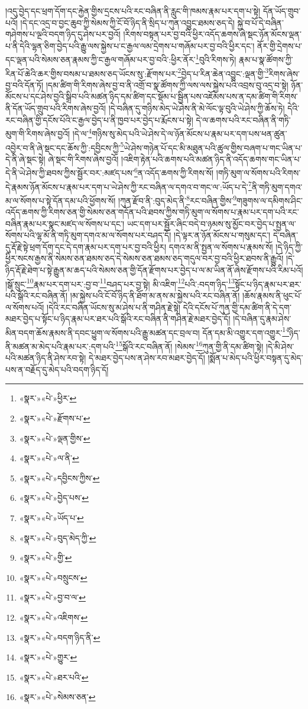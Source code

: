 །འདུ་བྱེད་དང་ཕྲག་དོག་དང་རྐྱེན་གྱིས་དྲངས་པའི་རང་བཞིན་ནི་རླུང་གི་ཁམས་རྣམ་པར་དག་པ་སྟེ། དོན་ཡོད་གྲུབ་པའོ། །དེ་དང་འདྲ་བ་བྱང་ཆུབ་ཀྱི་སེམས་ཀྱི་ངོ་བོ་ཉིད་ནི་སྲིད་པ་ཀུན་འབྱུང་ཐམས་ཅད་དེ། སྐྱེ་བ་པོ་དེ་བཞིན་གཤེགས་པ་ལྔའི་བདག་ཉིད་དུ་ཤེས་པར་བྱའོ། །རིགས་བསྟན་པར་བྱ་བའི་ཕྱིར་འདོད་ཆགས་ཞེ་སྡང་ཉོན་མོངས་ལྡན་པ་ནི་དེའི་ལྷན་ཅིག་བྱེད་པའི་རྒྱུ་ལས་སྐྱེས་པ་ང་རྒྱལ་ལམ་དྲེགས་པ་གཞོམ་པར་བྱ་བའི་ཕྱིར་དང་། ནོར་གྱི་དྲེགས་པ་དང་ལྡན་པའི་སེམས་ཅན་རྣམས་ཀྱི་ང་རྒྱལ་གཞོམ་པར་བྱ་བའི་:ཕྱིར་ནོར་\footnote{«སྣར་»«པེ་»ཕྱིར་}བུའི་རིགས་ཏེ། རྣམ་པ་སྣ་ཚོགས་ཀྱི་རིན་པོ་ཆེའི་ཆར་གྱིས་བསམ་པ་ཐམས་ཅད་ཡོངས་སུ་:རྫོགས་པར་\footnote{«སྣར་»«པེ་»རྫོགས་པ་}བྱེད་པ་རིན་ཆེན་འབྱུང་:ལྡན་གྱི་\footnote{«སྣར་»«པེ་»ལྡན་གྱིས་}རིགས་ཞེས་བྱ་བའི་དོན་ཏོ། །དམ་ཚིག་གི་རིགས་ཞེས་བྱ་བ་ནི་འགྲོ་བ་སྣ་ཚོགས་ཀྱི་ལས་ལས་སྐྱེས་པའི་འབྲས་བུ་འདྲ་བ་སྟེ། ཉོན་མོངས་པ་དང་ཤེས་བྱའི་སྒྲིབ་པའི་མཚན་ཉིད་དམ་ཚིག་དང་སྡོམ་པ་སྦྱིན་པས་འཇོམས་པས་ན་དམ་ཚིག་གི་རིགས་ནི་དོན་ཡོད་གྲུབ་པའི་རིགས་ཞེས་བྱའོ། །དེ་བཞིན་དུ་གཉིས་མེད་ཡེ་ཤེས་ནི་མེ་ལོང་ལྟ་བུའི་ཡེ་ཤེས་ཀྱི་ཆོས་ཏེ། དེའི་རང་བཞིན་གྱི་དངོས་པོའི་ང་རྒྱལ་བྱེད་པ་ནི་ཁྱབ་པར་བྱེད་པ་རྨོངས་པ་སྟེ། དེ་ལ་ཆགས་པའི་རང་བཞིན་ནི་གཏི་མུག་གི་རིགས་ཞེས་བྱའོ། །དེ་ལ་\footnote{«སྣར་»«པེ་»ལ་ནི་}གཉིས་སུ་མེད་པའི་ཡེ་ཤེས་དེ་ལ་ཉོན་མོངས་པ་རྣམ་པར་དག་པས་ཕན་ཚུན་འབྱེར་བ་ནི་ཞེ་སྡང་དང་ཆོས་ཀྱི་:དབྱིངས་ཀྱི་\footnote{«སྣར་»«པེ་»དབྱིངས་ཀྱིས་}ཡེ་ཤེས་གཉེན་པོ་དང་མི་མཐུན་པའི་ཚུལ་གྱིས་བཞག་པ་གང་ཡིན་པ་དེ་ནི་ཞེ་སྡང་སྟེ། ཞེ་སྡང་གི་རིགས་ཞེས་བྱའོ། །འཇིག་རྟེན་པའི་ཆགས་པའི་མཚན་ཉིད་ནི་འདོད་ཆགས་གང་ཡིན་པ་དེ་ནི་ཡེ་ཤེས་ཀྱི་ཐབས་ཀྱིས་སྦྱོར་བར་:མཛད་པས་\footnote{«སྣར་»«པེ་»བྱེད་པས་}ན་འདོད་ཆགས་ཀྱི་རིགས་སོ། །གཏི་མུག་ལ་སོགས་པའི་རིགས་དེ་རྣམས་ཉོན་མོངས་པ་རྣམ་པར་དག་པ་ཡེ་ཤེས་ཀྱི་རང་བཞིན་ལ་དགའ་བ་གང་ལ་:ཡོད་པ་དེ་\footnote{«སྣར་»«པེ་»ཡོད་པ་}ནི་གཏི་མུག་དགའ་མ་ལ་སོགས་པ་སྟེ་དོན་དམ་པའི་ཕྱོགས་སོ། །ཀུན་རྫོབ་ནི་:བུད་མེད་ནི་\footnote{«སྣར་»«པེ་»བུད་མེད་ཀྱི་}རང་བཞིན་གྱིས་\footnote{«སྣར་»«པེ་»གྱི་}གཟུགས་ལ་དམིགས་ཤིང་འདོད་ཆགས་ཀྱི་རིགས་ཅན་གྱི་སེམས་ཅན་གདོན་པའི་ཐབས་ཀྱིས་གཏི་མུག་ལ་སོགས་པ་རྣམ་པར་དག་པའི་རང་བཞིན་རྣམ་པར་སྣང་མཛད་ལ་སོགས་པ་དང་། ཡང་དག་པར་སྦྱོར་ཞིང་བདེ་བ་ཉམས་སུ་མྱོང་བར་བྱེད་པ་སྤྱན་ལ་སོགས་པའི་ལྷ་མོ་ནི་གཏི་མུག་དགའ་མ་ལ་སོགས་པར་བཤད་དོ། །དེ་ལྟར་ན་ཉོན་མོངས་པ་གསུམ་དང་། དེ་བཞིན་དུ་རྡོ་རྗེ་སྟེ་ཕྲག་དོག་དང་དེ་དག་རྣམ་པར་དག་པར་བྱ་བའི་ཕྱིར། དགའ་མ་ནི་སྤྱན་ལ་སོགས་པ་རྣམས་སོ། །དེ་ཉིད་ཀྱི་ཕྱིར་སངས་རྒྱས་ནི་སེམས་ཅན་ཐམས་ཅད་དེ་སེམས་ཅན་ཐམས་ཅད་གདུལ་བར་བྱ་བའི་ཕྱིར་ཐབས་ནི་རྒྱུའོ། །དེ་ཉིད་རྡོ་རྗེ་ཐེག་པ་སྟེ་རྒྱུན་མ་ཆད་པའི་སེམས་ཅན་གྱི་དོན་རྫོགས་པར་བྱེད་པ་ལ་མ་ཡིན་ནོ་ཞེས་རྫོགས་པའི་རིམ་པའོ། །སྒོ་སྲུང་\footnote{«སྣར་»«པེ་»བསྲུངས་}རྣམ་པར་དག་པར་:བྱ་བ་\footnote{«སྣར་»«པེ་»བྱ་བ་ལ་}བཤད་པར་བྱ་སྟེ། མི་འཇིག་\footnote{«སྣར་»«པེ་»འཇིགས་}པའི་:བདག་ཉིད་\footnote{«སྣར་»«པེ་»བདག་ཉིད་ནི་}སྟོང་པ་ཉིད་རྣམ་པར་ཐར་པའི་སྒོའི་རང་བཞིན་ནོ། །མ་སྐྱེས་པའི་ངོ་བོ་ཉིད་ནི་ཐོག་མ་ནས་མ་སྐྱེས་པའི་རང་བཞིན་ནོ། །ཆོས་རྣམས་ནི་ཕུང་པོ་ལ་སོགས་པའོ། །དེའི་རང་བཞིན་ཡོངས་སུ་མ་ཤེས་པ་ནི་གཤིན་རྗེ་སྟེ། དེའི་དངོས་པོ་ཀུན་གྱི་དམ་ཚིག་ནི་དེ་དག་མཐར་བྱེད་པ་སྟོང་པ་ཉིད་རྣམ་པར་ཐར་པའི་སྒོའི་རང་བཞིན་ནི་གཤིན་རྗེ་མཐར་བྱེད་དོ། །དེ་བཞིན་དུ་རྣམ་ཤེས་མིན་བདག་ཆོས་རྣམས་ནི་དབང་ཕྱུག་ལ་སོགས་པའི་རྒྱུ་མཚན་དང་བྲལ་བ། དོན་དམ་མི་འགྱུར་དག་འགྱུར་\footnote{«སྣར་»«པེ་»གྱུར་}ཉིད་ནི་མཚན་མ་མེད་པའི་རྣམ་པར་:དག་པའི་\footnote{«སྣར་»«པེ་»ཐར་པའི་}སྒོའི་རང་བཞིན་ནོ། །སེམས་\footnote{«སྣར་»«པེ་»སེམས་ཅན་}ཀུན་གྱི་ནི་དམ་ཚིག་སྟེ། །དེ་མི་ཤེས་པའི་མཚན་ཉིད་ནི་ཤེས་རབ་སྟེ། དེ་མཐར་བྱེད་པས་ན་ཤེས་རབ་མཐར་བྱེད་དོ། །སྨོན་པ་མེད་པའི་ཕྱིར་བསྟན་དུ་མེད་པས་ན་བརྗོད་དུ་མེད་པའི་བདག་ཉིད་དོ། 